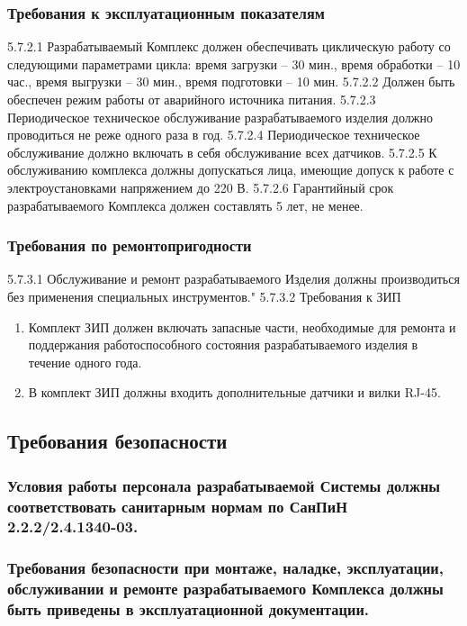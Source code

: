 			\subsubsection{Требования к эксплуатационным показателям}
				5.7.2.1 Разрабатываемый Комплекс должен обеспечивать циклическую работу со следующими параметрами цикла: время загрузки – 30 мин., время обработки – 10 час., время выгрузки – 30 мин., время подготовки – 10 мин.
				5.7.2.2 Должен быть обеспечен режим работы от аварийного источника питания.
				5.7.2.3 Периодическое техническое обслуживание разрабатываемого изделия должно проводиться не реже одного раза в год.
				5.7.2.4 Периодическое техническое обслуживание должно включать в себя обслуживание всех датчиков.
				5.7.2.5 К обслуживанию комплекса должны допускаться лица, имеющие допуск к работе с электроустановками напряжением до 220 В.
				5.7.2.6 Гарантийный срок разрабатываемого Комплекса должен составлять 5 лет, не менее.
			\subsubsection{Требования по ремонтопригодности}
				5.7.3.1 Обслуживание и ремонт разрабатываемого Изделия должны производиться без применения специальных инструментов."
				5.7.3.2 Требования к ЗИП
				\begin{enumerate}
					\item Комплект ЗИП должен включать запасные части, необходимые для ремонта и поддержания работоспособного состояния разрабатываемого изделия в течение одного года.
					\item В комплект ЗИП должны входить дополнительные датчики и вилки RJ-45.
				\end{enumerate}
		\subsection{Требования безопасности}
			\subsubsection{Условия работы персонала разрабатываемой Системы должны соответствовать санитарным нормам по СанПиН 2.2.2/2.4.1340-03.}
			\subsubsection{Требования безопасности при монтаже, наладке, эксплуатации, обслуживании и ремонте разрабатываемого Комплекса должны быть приведены в эксплуатационной документации.}
